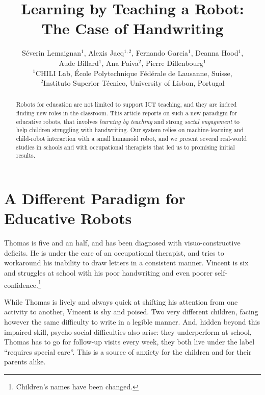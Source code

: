 \documentclass{article}
\title{Learning by Teaching a Robot:\\The Case of Handwriting}
\author{S\'everin Lemaignan$^1$, Alexis Jacq$^{1,2}$, Fernando Garcia$^1$,
    Deanna Hood$^1$, \\Aude
    Billard$^1$, Ana Paiva$^2$, Pierre Dillenbourg$^1$ \\
$^1$CHILI Lab, \'Ecole Polytechnique F\'ed\'erale de Lausanne, Suisse,\\
$^2$Instituto Superior T\'{e}cnico, University of Lisbon, Portugal}
\begin{document}
\maketitle

\begin{abstract}

    Robots for education are not limited to support ICT teaching, and they are
    indeed finding new roles in the classroom. This article reports on such a
    new paradigm for educative robots, that involves \emph{learning by teaching}
    and strong \emph{social engagement} to help children struggling with
    handwriting. Our system relies on machine-learning and child-robot
    interaction with a small humanoid robot, and we present several real-world
    studies in schools and with occupational therapists that led us to promising
    initial results.

\end{abstract}


\section{A Different Paradigm for Educative Robots}

Thomas is five and an half, and has been diagnosed with visuo-constructive
deficits. He is under the care of an occupational therapist, and tries to
workaround his inability to draw letters in a consistent manner. Vincent is six
and struggles at school with his poor handwriting and even poorer
self-confidence.\footnote{Children's names have been changed.}

While Thomas is lively and always quick at shifting his attention from one
activity to another, Vincent is shy and poised. Two very different children,
facing however the same difficulty to write in a legible manner. And, hidden
beyond this impaired skill, psycho-social difficulties also arise: they
underperform at school, Thomas has to go for follow-up visits every week,
they both live under the label ``requires special care''. This is a source of
anxiety for the children and for their parents alike.
\end{document}

